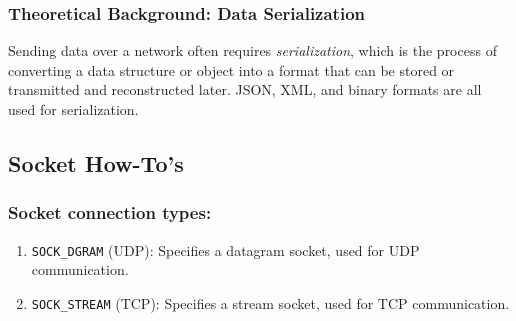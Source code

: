 \subsubsection{Theoretical Background: Data Serialization}
Sending data over a network often requires \textit{serialization}, which is the process of converting a data structure or object into a format that can be stored or transmitted and reconstructed later.  JSON, XML, and binary formats are all used for serialization.

\subsection{Socket How-To’s}

\subsubsection{Socket connection types:}
\begin{enumerate}[noitemsep]
    \item \texttt{SOCK\_DGRAM} (UDP): Specifies a datagram socket, used for UDP communication.
    \item \texttt{SOCK\_STREAM} (TCP): Specifies a stream socket, used for TCP communication.
\end{enumerate}

